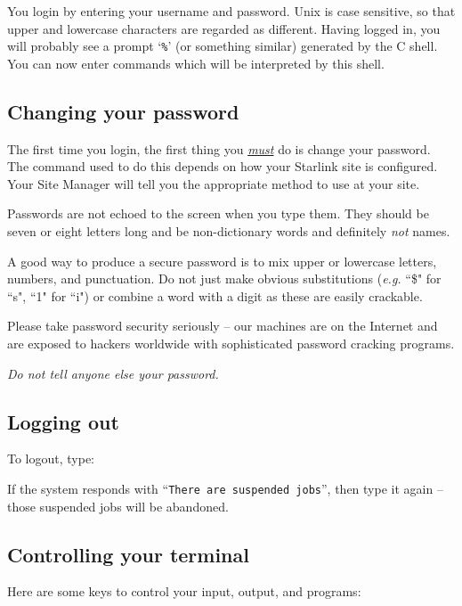 \documentclass[twoside,11pt,nolof]{starlink}
\begin{document}
You login by entering your username and password.
Unix is case sensitive, so that upper and lowercase characters are
regarded as different.
Having logged in, you will probably see a prompt `\texttt{\%}' (or something
similar) generated by the
C shell.
You can now enter commands which will
be interpreted by this shell.

\subsection{Changing your password}

The first time you login, the first thing you \underline{\emph{must\/}} do
is change your password.
The command used to do this depends on how your Starlink site
is configured.
Your Site Manager will tell you the appropriate method to use at your site.

Passwords are not echoed to the screen when you type them.
They should be seven or eight letters long and
be non-dictionary words and definitely \emph{not}\/ names.

A good way to produce a secure password is to mix upper or lowercase
letters, numbers, and punctuation. Do not just make obvious substitutions
(\emph{e.g.}\/ ``\$" for ``s", ``1" for ``i") or combine a word with a digit
as these are easily crackable.

Please take password security seriously -- our machines are on the
Internet and are exposed to hackers worldwide with sophisticated
password cracking programs.

\emph{Do not tell anyone else your password.}

\subsection{Logging out}

To logout, type:
\begin{terminalv}
\end{terminalv}
If the system responds with ``\texttt{There are suspended jobs}'', then type it
again -- those suspended jobs will be abandoned.

\subsection{Controlling your terminal}

Here are some keys to control your input, output, and programs:
\end{document}
